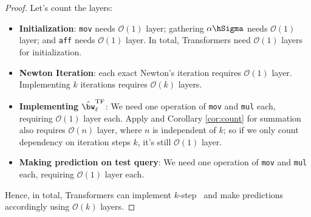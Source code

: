 \begin{proof}
Let's count the layers:
\begin{itemize}
    \item \textbf{Initialization}: \verb|mov| needs $\mathcal O(1)$ layer; gathering $\alpha \hSigma$ needs $\mathcal O(1)$ layer; and \verb|aff| needs $\mathcal O(1)$ layer. In total, Transformers need $\mathcal O(1)$ layers for initialization. 
    \item \textbf{Newton Iteration}: each exact Newton's iteration requires $\mathcal O(1)$ layer. Implementing $k$ iterations requires $\mathcal O(k)$ layers.
    \item \textbf{Implementing $\hat{\bw}_\ell^\mathrm{TF}$}: We need one operation of \verb|mov| and \verb|mul| each, requiring $\mathcal O(1)$ layer each. Apply  and Corollary \ref{cor:count} for summation also requires $\mathcal O(n)$ layer, where $n$ is independent of $k$; so if we only count dependency on  iteration steps $k$, it's still $\mathcal O(1)$ layer. 
    \item \textbf{Making prediction on test query}:  We need one operation of \verb|mov| and \verb|mul| each, requiring $\mathcal O(1)$ layer each.
\end{itemize}
Hence, in total, Transformers can implement $k$-step \newton\ and make predictions accordingly using $\mathcal{O}(k)$ layers. 


\end{proof}
